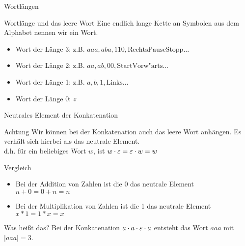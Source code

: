 \begin{frame}{Wortlängen}
    \begin{alertblock}{Wortlänge und das leere Wort}
        Eine endlich lange Kette an Symbolen aus dem Alphabet nennen wir ein Wort.
    \end{alertblock}
    \begin{itemize}
        \item Wort der Länge 3: z.B. $aaa, aba, 110, \text{RechtsPauseStopp} \dots$
        \item Wort der Länge 2: z.B. $aa, ab, 00, \text{StartVorw"arts} \dots$
        \item Wort der Länge 1: z.B. $a, b, 1, \text{Links} \dots$
        \item Wort der Länge \alert<3>{0}: \alert<3>{$\varepsilon$}
    \end{itemize}
\end{frame}

\begin{frame}{Neutrales Element der Konkatenation}
    \begin{alertblock}{Achtung}
        Wir können bei der Konkatenation auch das leere Wort anhängen. Es verhält sich hierbei als das \alert<1>{neutrale Element}.\\
        d.h. für ein beliebiges Wort $w$, ist $w \cdot \varepsilon = \varepsilon \cdot w = w$
        \begin{exampleblock}{Vergleich}
            \begin{itemize}
                \item Bei der Addition von Zahlen ist die 0 das neutrale Element\\
                $n + 0 = 0 + n = n$
                \item Bei der Multiplikation von Zahlen ist die 1 das neutrale Element\\
                $x * 1 = 1 * x = x$
            \end{itemize}
        \end{exampleblock}
    \end{alertblock}
	\begin{alertblock}{Was heißt das?}
		Bei der Konkatenation $a \cdot a \cdot \varepsilon \cdot a$ entsteht das Wort $aaa$ mit $|aaa| = 3$.
	\end{alertblock}
\end{frame}
